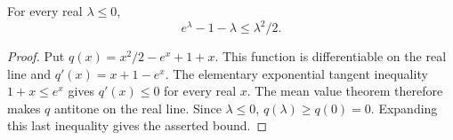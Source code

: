 \begin{helper}
For every real $\lambda\le0$,
\[
 e^\lambda-1-\lambda\le\lambda^2/2.
\]
\end{helper}
\begin{proof}
Put $q(x)=x^2/2-e^x+1+x$. This function is differentiable on the
real line and $q'(x)=x+1-e^x$. The elementary exponential tangent
inequality $1+x\le e^x$ gives $q'(x)\le0$ for every real $x$.
The mean value theorem therefore makes $q$ antitone on the real line.
Since $\lambda\le0$, $q(\lambda)\ge q(0)=0$. Expanding this last
inequality gives the asserted bound.
\end{proof}
